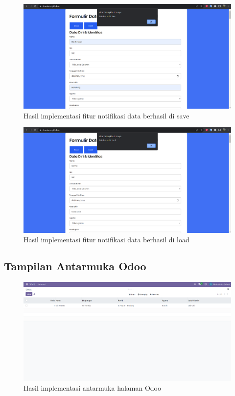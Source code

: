 \begin{figure}[H]
	\centering
	\includegraphics[scale=0.4]{Gambar/saveBerhasil.png}
	\caption{Hasil implementasi fitur notifikasi data berhasil di save} 
	\label{fig:saveBerhasil}
\end{figure}

\begin{figure}[H]
	\centering
	\includegraphics[scale=0.4]{Gambar/loadBerhasil.png}
	\caption{Hasil implementasi fitur notifikasi data berhasil di load} 
	\label{fig:loadBerhasil}
\end{figure}

\subsection{Tampilan Antarmuka Odoo}
\label{sec:tampilanAntarmukaOdoo}

\begin{figure}[H]
	\centering
	\includegraphics[scale=0.4]{Gambar/odooBuatBaru.png}
	\caption{Hasil implementasi antarmuka halaman Odoo} 
	\label{fig:odooBuatBaru}
\end{figure}

